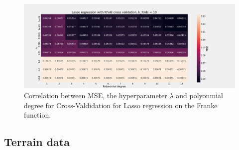 \begin{figure}[H]
    \centering
    \includegraphics[width=\textwidth]{Figures/f_lasso_kfold_n_10.png}
    \caption{Correlation between MSE, the hyperparameter $\lambda$ and polyonmial degree for Cross-Valdidation for Lasso regression on the Franke function.}
    \label{fig:f_lasso_kflod}
\end{figure}



 







\subsection{Terrain data}

